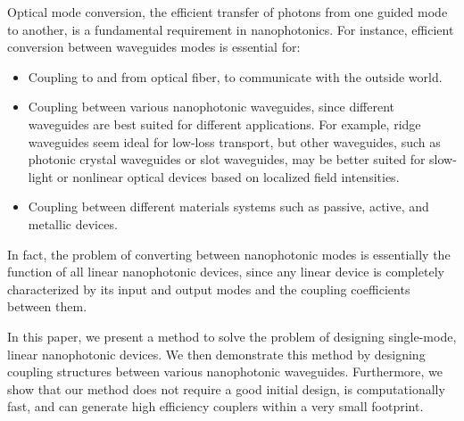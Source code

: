 Optical mode conversion, 
    the efficient transfer of photons from one guided mode to another,
    is a fundamental requirement in nanophotonics.
For instance, efficient conversion between waveguides modes
    is essential for:
    \begin{itemize}
        \item Coupling to and from optical fiber\cite{fibergrating}, 
        to communicate with the outside world.
    \item Coupling between various nanophotonic waveguides, 
        since different waveguides are best suited for different applications.
        For example, ridge waveguides seem ideal for 
            low-loss transport\cite{ridge},
            but other waveguides, 
            such as photonic crystal waveguides or slot waveguides,
            may be better suited for slow-light\cite{pcslow} 
            or nonlinear optical devices based on 
            localized field intensities\cite{slotfocus}.
    \item Coupling between different materials systems such as
       passive, active\cite{active}, and metallic\cite{metallic} devices. 
    \end{itemize}
In fact, the problem of converting between nanophotonic modes is essentially
    the function of all linear nanophotonic devices, since
    any linear device is completely characterized by its input and output modes
    and the coupling coefficients between them.

In this paper, we present a method to solve the problem 
    of designing single-mode, linear nanophotonic devices.
We then demonstrate this method by designing coupling structures 
    between various nanophotonic waveguides.
Furthermore, we show that our method 
     does not require a good initial design,
     is computationally fast,
     and can generate high efficiency couplers within a very small footprint. 
% 
% 
% 

